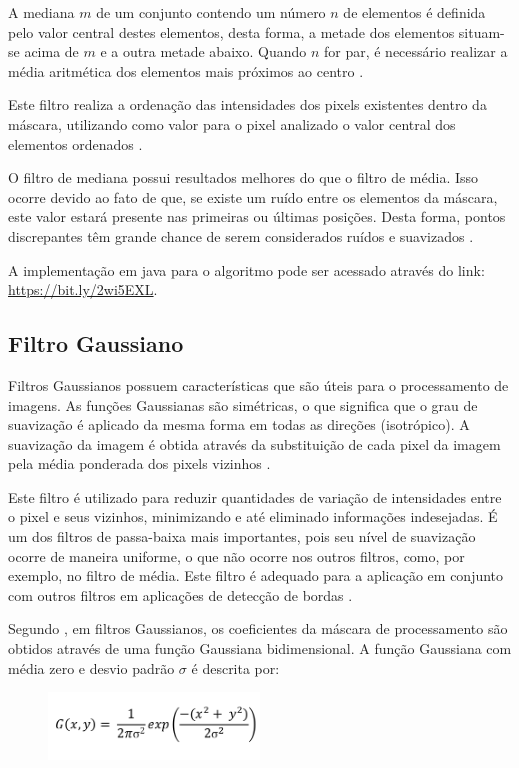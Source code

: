 \documentclass[
	12pt,				%
	oneside,			%
	a4paper,			%
	english,			%
	french,				%
	spanish,			%
	brazil,				%
	]{abntex2}
\begin{document}
A mediana \(m\) de um conjunto contendo um número \(n\) de elementos é definida pelo valor central destes elementos, desta forma, a metade dos elementos situam-se acima de \(m\) e a outra metade abaixo. Quando \(n\) for par, é necessário realizar a média aritmética dos elementos mais próximos ao centro \cite{conciAzevedoLeta:2008}.

Este filtro realiza a ordenação das intensidades dos pixels existentes dentro da máscara, utilizando como valor para o pixel analizado o valor central dos elementos ordenados \cite{conciAzevedoLeta:2008}.

O filtro de mediana possui resultados melhores do que o filtro de média. Isso ocorre devido ao fato de que, se existe um ruído entre os elementos da máscara, este valor estará presente nas primeiras ou últimas posições. Desta forma, pontos discrepantes têm grande chance de serem considerados ruídos e suavizados \cite{conciAzevedoLeta:2008}.

A implementação em java para o algoritmo pode ser acessado através do link: \url{https://bit.ly/2wi5EXL}. 

\subsection{Filtro Gaussiano}
Filtros Gaussianos possuem características que são úteis para o processamento de imagens. As funções Gaussianas são simétricas, o que significa que o grau de suavização é aplicado da mesma forma em todas as direções (isotrópico). A suavização da imagem é obtida através da substituição de cada pixel da imagem pela média ponderada dos pixels vizinhos \cite{pedriniSchwartz:2008}. 

Este filtro é utilizado para reduzir quantidades de variação de intensidades entre o pixel e seus vizinhos, minimizando e até eliminado informações indesejadas. É um dos filtros de passa-baixa mais importantes, pois seu nível de suavização ocorre de maneira uniforme, o que não ocorre nos outros filtros, como, por exemplo, no filtro de média. Este filtro é adequado para a aplicação em conjunto com outros filtros em aplicações de detecção de bordas \cite{conciAzevedoLeta:2008}.   

Segundo \citet{pedriniSchwartz:2008}, em filtros Gaussianos, os coeficientes da máscara de processamento são obtidos através de uma função Gaussiana bidimensional. A função Gaussiana com média zero e desvio padrão \(\sigma\) é descrita por:

\begin{figure}[ht]
\centering
\includegraphics[width=0.5\textwidth]{imagens/gauss_formula.png}
\end{figure}
\end{document}
